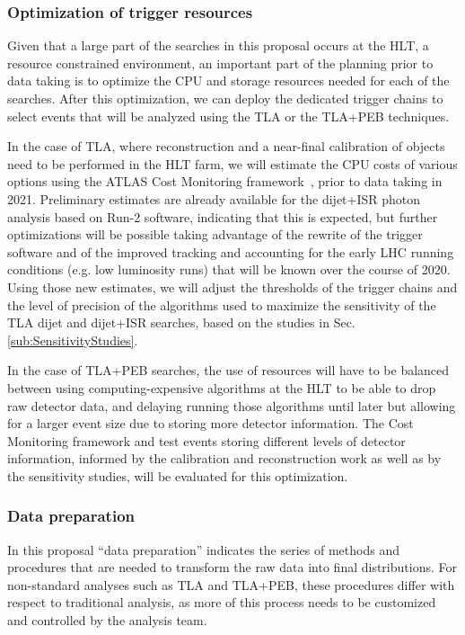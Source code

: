 \subsubsection{Optimization of trigger resources}

Given that a large part of the searches in this proposal occurs at the HLT, a resource constrained environment, an important part of the planning prior to data taking is to optimize the CPU and storage resources needed for each of the searches. After this optimization, we can deploy the dedicated trigger chains to select events that will be analyzed using the TLA or the TLA+PEB techniques. 

In the case of TLA, where reconstruction and a near-final calibration of objects need to be performed in the HLT farm, we will estimate the CPU costs of various options using the ATLAS Cost Monitoring framework~\cite{CostMonitoringTim}, prior to data taking in 2021.  
Preliminary estimates are already available for the dijet+ISR photon analysis based on Run-2 software, indicating that this is expected, but further optimizations will be possible taking advantage of the rewrite of the trigger software and of the improved tracking and accounting for the early LHC running conditions (e.g. low luminosity runs) that will be known over the course of 2020. Using those new estimates, we will adjust the thresholds of the trigger chains and the level of precision of the algorithms used to maximize the sensitivity of the TLA dijet and dijet+ISR searches, based on the studies in Sec.\ref{sub:SensitivityStudies}. 
 
In the case of TLA+PEB searches, the use of resources will have to be balanced between using computing-expensive algorithms at the HLT to be able to drop raw detector data, and delaying running those algorithms until later but allowing for a larger event size due to storing more detector information. The Cost Monitoring framework and test events storing different levels of detector information, informed by the calibration and reconstruction work as well as by the sensitivity studies, will be evaluated for this optimization. 



\subsubsection{Data preparation}


In this proposal “data preparation” indicates the series of methods and procedures that are needed to transform the raw data into final distributions. For non-standard analyses such as TLA and TLA+PEB, these procedures differ with respect to traditional analysis, as more of this process needs to be customized and controlled by the analysis team. 

